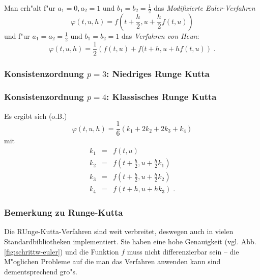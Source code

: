 \documentclass[a4paper]{book}
\begin{document}
Man erh"alt f"ur $a_1 = 0, a_2 = 1 \text{ und } b_1=b_2=\frac{1}{2}$
das \emph{Modifizierte Euler-Verfahren}
\begin{equation}
  \label{eq:modeuler}
  \varphi(t,u,h) = f( t+\frac{h}{2} , u+\frac{h}{2} f(t,u) )
\end{equation}
und f"ur $a_1=a_2 = \frac{1}{2} \text{ und } b_1 = b_2 = 1$ das
\emph{Verfahren von Heun}:
\begin{equation}
  \label{eq:73}
  \varphi(t,u,h) = \frac{1}{2} \left (  f(t,u) + f(t+h, u+h f(t,u)
  \right ) \;.
\end{equation}



\subsubsection{Konsistenzordnung $p=3$: Niedriges Runge Kutta}
\label{sec:kons_p=3:_niedr_runge_kutta}




\subsubsection{Konsistenzordnung $p=4$: Klassisches Runge Kutta}
\label{sec:kons_p=4:_klass_runge_kutta}

Es ergibt sich (o.B.)
\begin{equation}
  \label{eq:klrungekutta}
  \varphi(t,u,h) = \frac{1}{6}\left (  k_1 + 2k_2 + 2k_3 + k_4 \right )
\end{equation}
mit
\begin{align*}
  k_1 &=& f(t,u) \\
  k_2 &=& f(t+\frac{h}{2},u+\frac{h}{2} k_1) \\
  k_3 &=& f(t+\frac{h}{2},u+\frac{h}{2} k_2) \\
  k_4 &=& f(t+h,u+h k_3)  \;.
\end{align*}



\subsubsection{Bemerkung zu Runge-Kutta}
\label{sec:bemerkung_zu_runge_kutta}

Die RUnge-Kutta-Verfahren sind weit verbreitet, deswegen auch in
vielen Standardbibliotheken implementiert. Sie haben eine hohe
Genauigkeit (vgl. Abb. \ref{fig:schrittw-euler}) und die Funktion $f$
muss nicht differenzierbar sein -- die M"oglichen Probleme auf die man
das Verfahren anwenden kann sind dementsprechend gro"s. 
\end{document}
